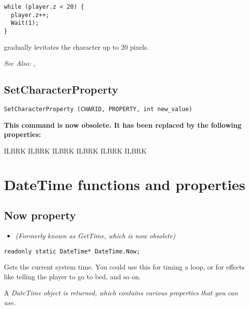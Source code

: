 \begin{verbatim}
while (player.z < 20) {
  player.z++;
  Wait(1);
}
\end{verbatim}
gradually levitates the character up to 20 pixels.

\it{See Also:} ,


\subsection{SetCharacterProperty}\label{SetCharacterProperty}%

\begin{verbatim}
SetCharacterProperty (CHARID, PROPERTY, int new_value)
\end{verbatim}

\bf{This command is now obsolete. It has been replaced by the following properties:}

 ILBRK
 ILBRK
 ILBRK
 ILBRK
 ILBRK
 ILBRK



\section{DateTime functions and properties}%


\subsection{Now property}\label{DateTime.Now}%

\begin{itemize}
\item \it{(Formerly known as GetTime, which is now obsolete)}
\end{itemize}

\begin{verbatim}
readonly static DateTime* DateTime.Now;
\end{verbatim}
Gets the current system time.
You could use this for timing a loop, or for effects like telling the
player to go to bed, and so on.

A \it{DateTime} object is returned, which contains various properties that you can use.


